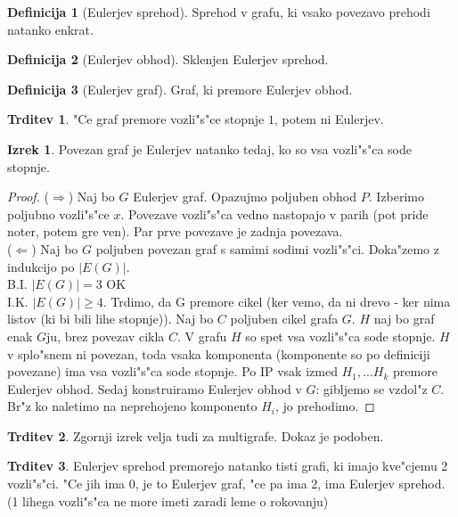 \documentclass{article}
\theoremstyle{definition}
\newtheorem{definition}{Definicija}[section]
\newtheorem{claim}{Trditev}[section]
\newtheorem{theorem}{Izrek}[section]
\begin{document}
	\begin{definition}[Eulerjev sprehod]
		Sprehod v grafu, ki vsako povezavo prehodi natanko enkrat.
	\end{definition}
	
	\begin{definition}[Eulerjev obhod]
		Sklenjen Eulerjev sprehod.
	\end{definition}
	
	\begin{definition}[Eulerjev graf]
		Graf, ki premore Eulerjev obhod.
	\end{definition}

	\begin{claim}
		"Ce graf premore vozli"s"ce stopnje $1$, potem ni Eulerjev.
	\end{claim}

	\begin{theorem}
		Povezan graf je Eulerjev natanko tedaj, ko so vsa vozli"s"ca sode stopnje.
		\begin{proof}
			($\Rightarrow$) Naj bo $G$ Eulerjev graf. Opazujmo poljuben obhod $P$. Izberimo poljubno vozli"s"ce $x$. Povezave vozli"s"ca vedno nastopajo v parih (pot pride noter, potem gre ven). Par prve povezave je zadnja povezava. \\
			($\Leftarrow$) Naj bo $G$ poljuben povezan graf s samimi sodimi vozli"s"ci. Doka"zemo z indukcijo po $|E(G)|$.\\
			B.I. $|E(G)| = 3$ OK \\
			I.K. $|E(G)| \geq 4$. Trdimo, da G premore cikel (ker vemo, da ni drevo - ker nima listov (ki bi bili lihe stopnje)). Naj bo $C$ poljuben cikel grafa $G$. $H$ naj bo graf enak $G$ju, brez povezav cikla $C$. V grafu $H$ so spet vsa vozli"s"ca sode stopnje. $H$ v splo"snem ni povezan, toda vsaka komponenta (komponente so po definiciji povezane) ima vsa vozli"s"ca sode stopnje. Po IP vsak izmed $H_1, ... H_k$ premore Eulerjev obhod. Sedaj konstruiramo Eulerjev obhod v $G$: gibljemo se vzdol"z $C$. Br"z ko naletimo na neprehojeno komponento $H_i$, jo prehodimo.
		\end{proof}
	\end{theorem}
	\begin{claim}
		Zgornji izrek velja tudi za multigrafe. Dokaz je podoben.
	\end{claim}
	
	\begin{claim}
		Eulerjev sprehod premorejo natanko tisti grafi, ki imajo kve"cjemu 2 vozli"s"ci. "Ce jih ima 0, je to Eulerjev graf, "ce pa ima 2, ima Eulerjev sprehod. (1 lihega vozli"s"ca ne more imeti zaradi leme o rokovanju)
	\end{claim}
\end{document}

